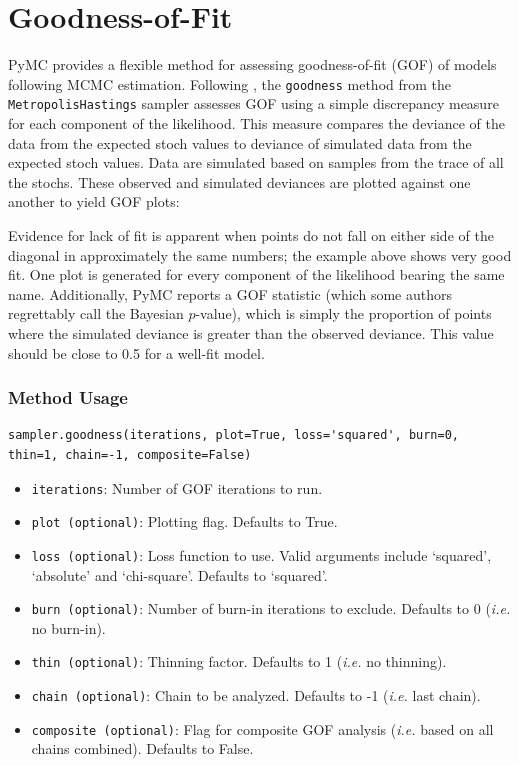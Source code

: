 \documentclass[]{book}
\begin{document}
\section{Goodness-of-Fit}

PyMC provides a flexible method for assessing goodness-of-fit (GOF) of models following MCMC estimation. Following \citet{Gelman:1996gp}, the \verb=goodness= method from the \verb=MetropolisHastings= sampler assesses GOF using a simple discrepancy measure for each component of the likelihood. This measure compares the deviance of the data from the expected stoch values to deviance of simulated data from the expected stoch values. Data are simulated based on samples from the trace of all the stochs. These observed and simulated deviances are plotted against one another to yield GOF plots:

Evidence for lack of fit is apparent when points do not fall on either side of the diagonal in approximately the same numbers; the example above shows very good fit. One plot is generated for every component of the likelihood bearing the same name. Additionally, PyMC reports a GOF statistic (which some authors regrettably call the Bayesian $p$-value), which is simply the proportion of points where the simulated deviance is greater than the observed deviance. This value should be close to 0.5 for a well-fit model.

\subsubsection{Method Usage}
\begin{verbatim}
sampler.goodness(iterations, plot=True, loss='squared', burn=0, thin=1, chain=-1, composite=False)
\end{verbatim}

\begin{itemize}

\item \verb=iterations=: Number of GOF iterations to run.

\item \verb=plot (optional)=: Plotting flag. Defaults to True.

\item \verb=loss (optional)=: Loss function to use. Valid arguments include ‘squared’, ‘absolute’ and ‘chi-square’. Defaults to ‘squared’.

\item \verb=burn (optional)=: Number of burn-in iterations to exclude. Defaults to 0 (\emph{i.e.} no burn-in).

\item \verb=thin (optional)=: Thinning factor. Defaults to 1 (\emph{i.e.} no thinning).

\item \verb=chain (optional)=: Chain to be analyzed. Defaults to -1 (\emph{i.e.} last chain).

\item \verb=composite (optional)=: Flag for composite GOF analysis (\emph{i.e.} based on all chains combined). Defaults to False.
\end{itemize}
 
\end{document}
